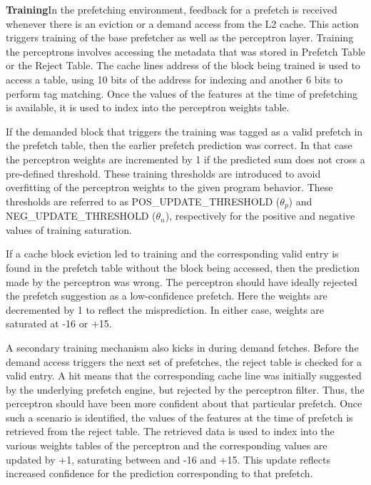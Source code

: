 
\textbf{Training}\newline In the prefetching environment, feedback for a
prefetch is received whenever there is an eviction or a demand access from the
L2 cache.  This action triggers training of the base prefetcher as well as the
perceptron layer.  Training the perceptrons involves accessing the metadata
that was stored in Prefetch Table or the Reject Table.  The cache lines
address of the block being trained is used to access a table, using 10 bits of
the address for indexing and another 6 bits to perform tag matching.  Once the
values of the features at the time of prefetching is available, it is used to
index into the perceptron weights table.

If the demanded block that triggers the training was tagged as a valid
prefetch in the prefetch table, then the earlier prefetch prediction was
correct.  In that case the perceptron weights are incremented by 1 if the
predicted sum does not cross a pre-defined threshold. These training
thresholds are introduced to avoid overfitting of the perceptron weights to
the given program behavior. These thresholds are referred to as
POS\_UPDATE\_THRESHOLD ($\theta_p$) and NEG\_UPDATE\_THRESHOLD ($\theta_n$),
respectively for the positive and negative values of training saturation.

If a cache block eviction led to training and the corresponding valid entry is
found in the prefetch table without the block being accessed, then the
prediction made by the perceptron was wrong.  The perceptron should have
ideally rejected the prefetch suggestion as a low-confidence prefetch.  Here
the weights are decremented by 1 to reflect the misprediction. In either case,
weights are saturated at -16 or +15.

A secondary training mechanism also kicks in during demand fetches.  Before
the demand access triggers the next set of prefetches, the reject table is
checked for a valid entry.  A hit means that the corresponding cache line was
initially suggested by the underlying prefetch engine, but rejected by the
perceptron filter.  Thus, the perceptron should have been more confident about
that particular prefetch.  Once such a scenario is identified, the values of
the features at the time of prefetch is retrieved from the reject table.  The
retrieved data is used to index into the various weights tables of the
perceptron and the corresponding values are updated by +1, saturating between
and -16 and +15.  This update reflects increased confidence for the prediction
corresponding to that prefetch.

